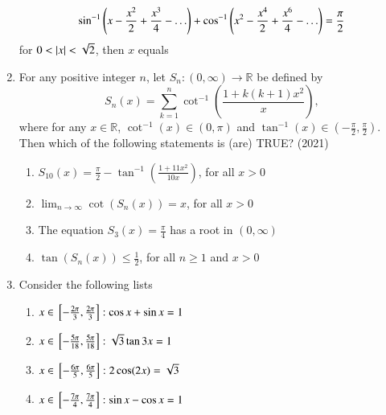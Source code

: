 \begin{enumerate}[label=\thesubsection.\arabic*,ref=\thesubsection.\theenumi]
\begin{align*}
\sin ^{-1}\left(x-\frac{x^2}{2}+\frac{x^3}{4}-\ldots\right)+ \cos ^{-1}\left(x^2-\frac{x^4}{2}+\frac{x^6}{4}-\ldots\right)=\frac{\pi}{2}
\end{align*}
for $0<\left\vert x\right\vert<\sqrt{2}$, then $x$ equals 
\hfill {}
\begin{enumerate}
\end{enumerate}
    \item For any positive integer $n$, let $S_n: (0, \infty) \to \mathbb{R}$ be defined by  
    \[
    S_n(x) = \sum_{k=1}^n \cot^{-1}\left(\frac{1 + k(k+1)x^2}{x}\right),
    \]  
    where for any $x \in \mathbb{R}$, $\cot^{-1}(x) \in (0, \pi)$ and $\tan^{-1}(x) \in \left(-\frac{\pi}{2}, \frac{\pi}{2}\right)$. Then which of the following statements is (are) TRUE?  
    \hfill (2021)
\begin{enumerate}
         \item  $S_{10}(x) = \frac{\pi}{2} - \tan^{-1}\left(\frac{1 + 11x^2}{10x}\right)$, for all $x > 0$  
         \item  $\lim_{n \to \infty} \cot(S_n(x)) = x$, for all $x > 0$  
         \item  The equation $S_3(x) = \frac{\pi}{4}$ has a root in $(0, \infty)$  
         \item  $\tan(S_n(x)) \leq \frac{1}{2}$, for all $n \geq 1$ and $x > 0$
    \end{enumerate}
	 \item Consider the following lists
\begin{multicols}{2}
	\begin{enumerate}[label=(\Roman*),itemsep=1ex]
		\item ${ x \in {}\left[ -\frac{2\pi}{3}, \frac{2\pi}{3}   \right] : \cos x + \sin x = 1 }$
\item ${ x \in {}\left[ -\frac{5\pi}{18}, \frac{5\pi}{18} \right] : \sqrt{3} \tan 3x = 1 }$
\item ${ x \in {}\left[ -\frac{6\pi}{5}, \frac{6\pi}{5}   \right] : 2 \cos (2x) = \sqrt{3} }$
\item ${ x \in {}\left[ -\frac{7\pi}{4}, \frac{7\pi}{4}   \right] : \sin x - \cos x = 1 }$
\end{enumerate}
	\columnbreak

\end{multicols}
\end{enumerate}
